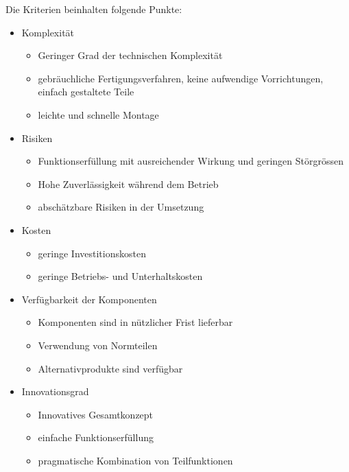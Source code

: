 Die Kriterien beinhalten folgende Punkte:
\begin{itemize}
	\item Komplexität
	\begin{itemize}
		\item Geringer Grad der technischen Komplexität
		
		\item gebräuchliche Fertigungsverfahren, keine aufwendige Vorrichtungen, einfach gestaltete Teile
		
		\item leichte und schnelle Montage
	\end{itemize}

	\item Risiken
	\begin{itemize}
	\item Funktionserfüllung mit ausreichender Wirkung und geringen Störgrössen
	
	\item Hohe Zuverlässigkeit während dem Betrieb
	
	\item abschätzbare Risiken in der Umsetzung
	\end{itemize}

	\item Kosten
	\begin{itemize}
	\item geringe Investitionskosten
	
	\item geringe Betriebs- und Unterhaltskosten
	\end{itemize}

	\item Verfügbarkeit der Komponenten
	\begin{itemize}
	\item Komponenten sind in nützlicher Frist lieferbar
	
	\item Verwendung von Normteilen
	
	\item Alternativprodukte sind verfügbar
	\end{itemize}
\newpage
	\item Innovationsgrad
	\begin{itemize}
	\item Innovatives Gesamtkonzept
	
	\item einfache Funktionserfüllung
	
	\item pragmatische Kombination von Teilfunktionen
	\end{itemize}


\end{itemize}
